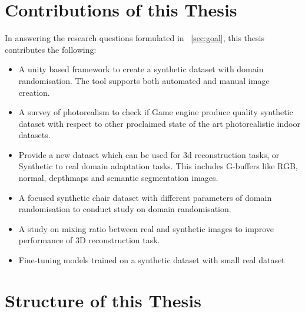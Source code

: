 
\section{Contributions of this Thesis}\label{sec:contributions}
In answering the research questions formulated in ~\ref{sec:goal}, this thesis contributes the following:

\begin{itemize}
    \item A unity based framework to create a synthetic dataset with domain randomisation.
    The tool supports both automated and manual image creation.
    \item A survey of photorealism to check if Game engine produce quality synthetic dataset with respect to other proclaimed state of the art photorealistic indoor datasets.
    \item Provide a new dataset which can be used for 3d reconstruction tasks, or Synthetic to real domain adaptation tasks.
    This includes G-buffers like RGB, normal, depthmaps and semantic segmentation images.
    \item A focused synthetic chair dataset with different parameters of domain randomisation to conduct study on domain randomisation.
    \item A study on mixing ratio between real and synthetic images to improve performance of 3D reconstruction task.
    \item Fine-tuning models trained on a synthetic dataset with small real dataset
\end{itemize}


\section{Structure of this Thesis}\label{sec:Structure of thesis}

